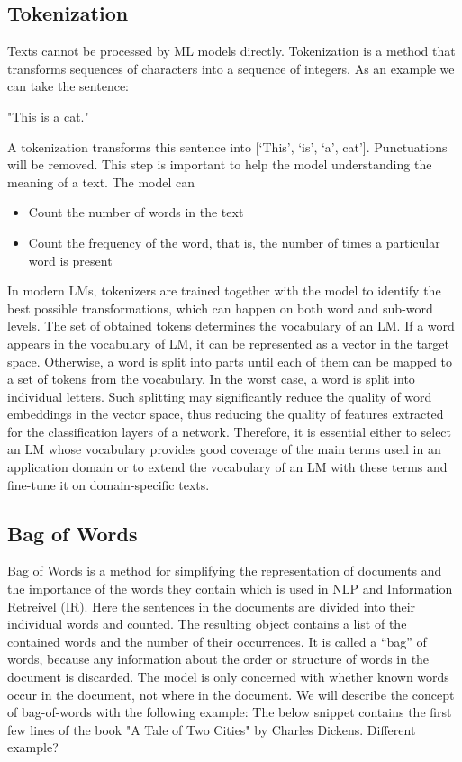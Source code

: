 \subsection{Tokenization}
Texts cannot be processed by ML models directly. Tokenization is a method that transforms sequences of characters into a sequence of integers. As an example we can take the sentence: \newline

\centerline{"This is a cat."} 

A tokenization transforms this sentence into [‘This’, ‘is’, ‘a’, cat’]. Punctuations will be removed. This step is important to help the model understanding the meaning of a text. The model can
\begin{itemize}
	\item Count the number of words in the text
	\item Count the frequency of the word, that is, the number of times a particular word is present
\end{itemize} 

In modern LMs, tokenizers are trained together with the model to identify the best possible transformations, which can happen on both word and sub-word levels. The set of obtained tokens determines the vocabulary of an LM. If a word appears in the vocabulary of LM, it can be represented as a vector in the target space. Otherwise, a word is split into parts until each of them can be mapped to a set of tokens from the vocabulary. In the worst case, a word is split into individual letters. Such splitting may significantly reduce the quality of word embeddings in the vector space, thus reducing the quality of features extracted for the classification layers of a network. Therefore, it is essential either to select an LM whose vocabulary provides good coverage of the main terms used in an application domain or to extend the vocabulary of an LM with these terms and fine-tune it on domain-specific texts. 

\subsection{Bag of Words}
Bag of Words is a method for simplifying the representation of documents and the importance of the words they contain which is used in NLP and Information Retreivel (IR). Here the sentences in the documents are divided into their individual words and counted. The resulting object contains a list of the contained words and the number of their occurrences. It is called a “bag” of words, because any information about the order or structure of words in the document is discarded. The model is only concerned with whether known words occur in the document, not where in the document. We will describe the concept of bag-of-words with the following example: The below snippet contains the first few lines of \alert{the book "A Tale of Two Cities" by Charles Dickens. Different example?}


